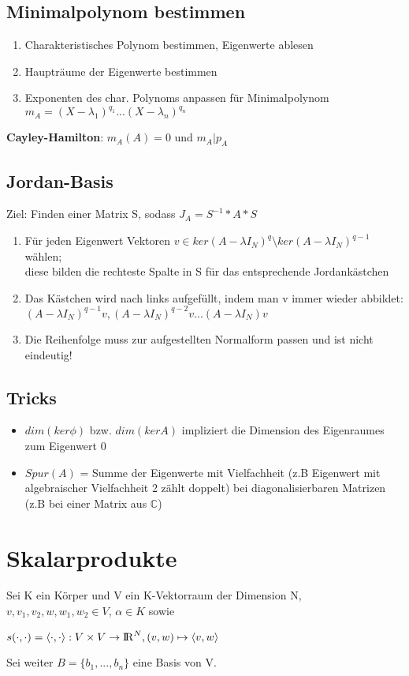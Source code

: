 \documentclass[10pt,a4paper]{article}
\def\realnumbers{{\rm I\!R}}
\def\complexnumbers{{\mathbb{C}}}
\begin{document}
	\subsection{Minimalpolynom bestimmen}
	\begin{enumerate}
		\item Charakteristisches Polynom bestimmen, Eigenwerte ablesen
		\item Haupträume der Eigenwerte bestimmen
		\item Exponenten des char. Polynoms anpassen für Minimalpolynom $m_A = (X - \lambda_1)^{q_1} ... (X - \lambda_n)^{q_n}$
	\end{enumerate}
	\textbf{Cayley-Hamilton}: $m_A(A) = 0$ und $m_A|p_A$

	\subsection{Jordan-Basis}
	Ziel: Finden einer Matrix S, sodass $J_A = S^{-1} * A * S$
	\begin{enumerate}
		\item Für jeden Eigenwert Vektoren $v \in ker(A - \lambda I_N)^q \setminus ker(A - \lambda I_N)^{q - 1}$ wählen;\\diese bilden die rechteste Spalte in S für das entsprechende Jordankästchen
		\item Das Kästchen wird nach links aufgefüllt, indem man v immer wieder abbildet:\\$(A - \lambda I_N)^{q - 1}v, (A - \lambda I_N)^{q - 2}v ... (A - \lambda I_N)v$
		\item Die Reihenfolge muss zur aufgestellten Normalform passen und ist nicht eindeutig!
	\end{enumerate}

	\subsection{Tricks}
		\begin{itemize}
			\item $dim(ker \phi)$ bzw. $dim(ker A)$ impliziert die Dimension des Eigenraumes zum Eigenwert 0
			\item $Spur(A)$ = Summe der Eigenwerte mit Vielfachheit (z.B Eigenwert mit algebraischer Vielfachheit 2 zählt doppelt) bei diagonalisierbaren Matrizen (z.B bei einer Matrix aus $\complexnumbers$)
		\end{itemize}
	
	\section{Skalarprodukte}
	Sei K ein Körper und V ein K-Vektorraum der Dimension N, $v, v_1, v_2, w, w_1, w_2 \in V$, $\alpha \in K$ sowie
	\begin{center}
		$s(\cdot,\cdot) = \langle\cdot,\cdot\rangle: V \times V \rightarrow \realnumbers^N, (v, w) \mapsto \langle v, w\rangle$
	\end{center}
	Sei weiter $B = \{b_1, ..., b_n\}$ eine Basis von V.
	
\end{document}
